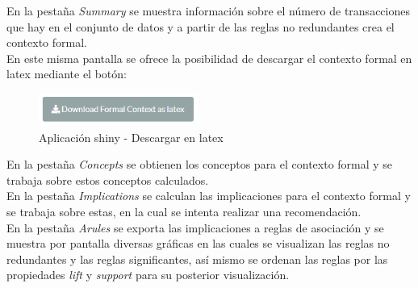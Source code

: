 \documentclass[../../main.tex]{subfiles}
\begin{document}
En la pestaña \textit{Summary} se muestra información sobre el número de transacciones que hay en el conjunto de datos y a partir de las reglas no redundantes crea el contexto formal.  \\

En este misma pantalla se ofrece la posibilidad de descargar el contexto formal en \gls{latex} mediante el botón:

\begin{figure}[H]
\centering
\includegraphics[height=30pt]{images/apendices/db-fca-latex.png}
\caption{Aplicación \Gls{shiny} - Descargar en \gls{latex}}
\end{figure}

En la pestaña \textit{Concepts} se obtienen los conceptos para el contexto formal y se trabaja sobre estos conceptos calculados.  \\

En la pestaña \textit{Implications} se calculan las implicaciones para el contexto formal y se trabaja sobre estas, en la cual se intenta realizar una recomendación.  \\

En la pestaña \textit{Arules} se exporta las implicaciones a reglas de asociación y se muestra por pantalla diversas gráficas en las cuales se visualizan las reglas no redundantes y las reglas significantes, así mismo se ordenan las reglas por las propiedades \textit{\gls{lift}} y \textit{\gls{support}} para su posterior visualización.  \\
\end{document}
